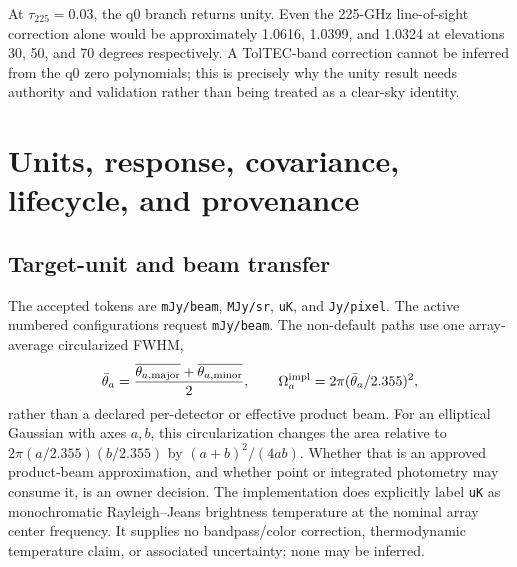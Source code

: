 \documentclass[11pt]{article}
\newcommand{\code}[1]{\nolinkurl{#1}}
\begin{document}
At \(\tau_{225}=0.03\), the q0 branch returns unity.  Even the 225-GHz
line-of-sight correction alone would be approximately 1.0616, 1.0399, and
1.0324 at elevations 30, 50, and 70 degrees respectively.  A TolTEC-band
correction cannot be inferred from the q0 zero polynomials; this is precisely
why the unity result needs authority and validation rather than being treated
as a clear-sky identity.

\section{Units, response, covariance, lifecycle, and provenance}

\subsection{Target-unit and beam transfer}

The accepted tokens are \code{mJy/beam}, \code{MJy/sr}, \code{uK}, and
\code{Jy/pixel}.  The active numbered configurations request
\code{mJy/beam}.  The non-default paths use one array-average circularized
FWHM,
\begin{equation}
 \bar\theta_a=\frac{\overline{\theta_{a,\rm major}}+
 \overline{\theta_{a,\rm minor}}}{2},\qquad
 \Omega_a^{\rm impl}=2\pi(\bar\theta_a/2.355)^2,
 \label{eq:audit-impl-beam}
\end{equation}
rather than a declared per-detector or effective product beam.  For an
elliptical Gaussian with axes \(a,b\), this circularization changes the area
relative to \(2\pi(a/2.355)(b/2.355)\) by
\((a+b)^2/(4ab)\).  Whether that is an approved product-beam approximation,
and whether point or integrated photometry may consume it, is an owner
decision.  The implementation does explicitly label \code{uK} as
monochromatic Rayleigh--Jeans brightness temperature at the nominal array
center frequency.  It supplies no bandpass/color correction, thermodynamic
temperature claim, or associated uncertainty; none may be inferred.
\end{document}
